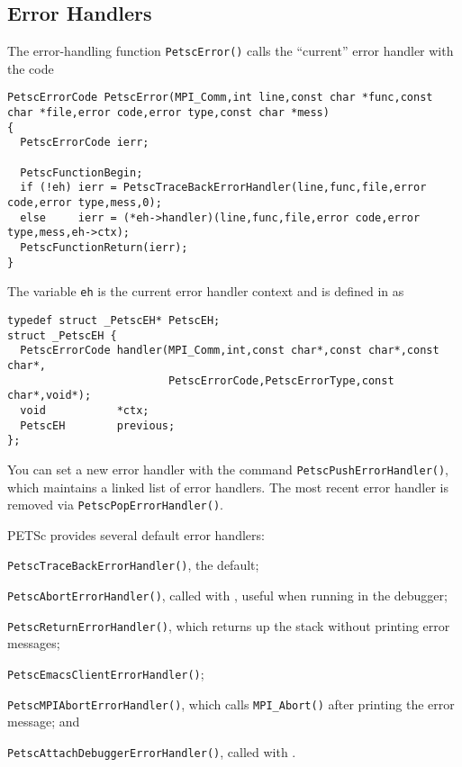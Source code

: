 \subsection{Error Handlers}
The error-handling function \lstinline{PetscError()} calls the ``current'' error handler
with the code
\begin{lstlisting}
PetscErrorCode PetscError(MPI_Comm,int line,const char *func,const char *file,error code,error type,const char *mess)
{
  PetscErrorCode ierr;

  PetscFunctionBegin;
  if (!eh) ierr = PetscTraceBackErrorHandler(line,func,file,error code,error type,mess,0);
  else     ierr = (*eh->handler)(line,func,file,error code,error type,mess,eh->ctx);
  PetscFunctionReturn(ierr);
}
\end{lstlisting}
The variable \lstinline{eh} is the current error handler context and is defined in
 \href{https://www.mcs.anl.gov/petsc/petsc-master/src/sys/error/err.c.html}{} as
\begin{lstlisting}
typedef struct _PetscEH* PetscEH;
struct _PetscEH {
  PetscErrorCode handler(MPI_Comm,int,const char*,const char*,const char*,
                         PetscErrorCode,PetscErrorType,const char*,void*);
  void           *ctx;
  PetscEH        previous;
};
\end{lstlisting}

You can set a new error handler with the command \lstinline{PetscPushErrorHandler()},
which maintains a linked list of error handlers.
The most recent error handler is removed
via \lstinline{PetscPopErrorHandler()}.

PETSc provides several default error handlers:
\begin{tightitemize}
  \item \lstinline{PetscTraceBackErrorHandler()}, the default;
  \item \lstinline{PetscAbortErrorHandler()}, called with , useful when running in the debugger;
  \item \lstinline{PetscReturnErrorHandler()}, which returns up the stack without printing error messages;
  \item \lstinline{PetscEmacsClientErrorHandler()};
  \item \lstinline{PetscMPIAbortErrorHandler()}, which calls \lstinline{MPI_Abort()} after printing the error message; and
  \item \lstinline{PetscAttachDebuggerErrorHandler()}, called with .
\end{tightitemize}

